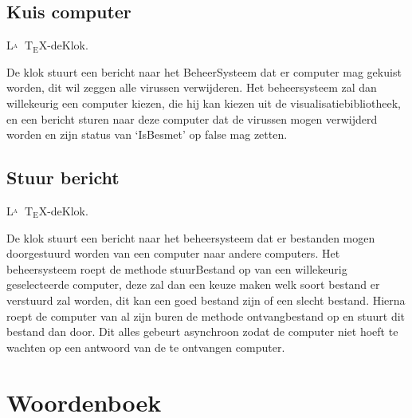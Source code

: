 \documentclass[a4paper,oneside]{report}
\def\latex{$\mathrm{L\!\!^{{}_{\scriptstyle A}} \!\!\!\!\!\;\; T\!_{\displaystyle E} \!
X}$}
\begin{document}
\subsection{Kuis computer}
\latex-deKlok.

De klok stuurt een bericht naar het BeheerSysteem dat er computer mag gekuist worden, dit wil zeggen alle virussen verwijderen. Het beheersysteem zal dan willekeurig een computer kiezen, die hij kan kiezen uit de visualisatiebibliotheek, en een bericht sturen naar deze computer dat de virussen mogen verwijderd worden en zijn status van ‘IsBesmet’ op false mag zetten.


\newpage
\subsection{Stuur bericht}
\latex-deKlok.

De klok stuurt een bericht naar het beheersysteem dat er bestanden mogen doorgestuurd worden van een computer naar andere computers. Het beheersysteem roept de methode stuurBestand op van een willekeurig geselecteerde computer, deze zal dan een keuze maken welk soort bestand er verstuurd zal worden, dit kan een goed bestand zijn of een slecht bestand. Hierna roept de computer van al zijn buren de methode ontvangbestand op en stuurt dit bestand dan door. Dit alles gebeurt asynchroon zodat de computer niet hoeft te wachten op een antwoord van de te ontvangen computer.


\newpage
\section{Woordenboek}
\end{document}
